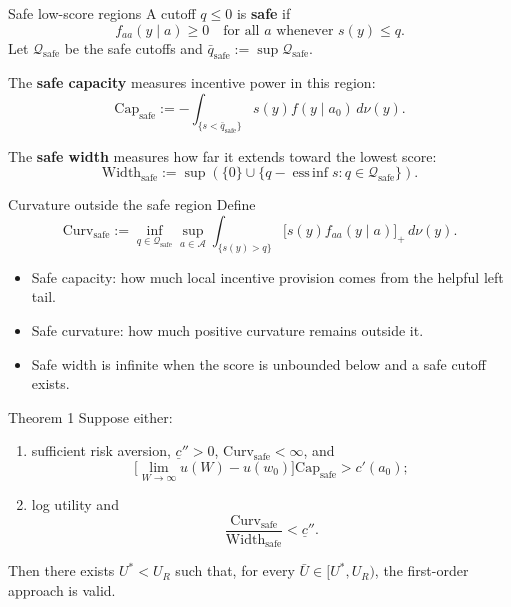 \documentclass[12pt,aspectratio=169,t]{beamer}
\begin{document}
\begin{frame}{Safe low-score regions}
  A cutoff $q\leq0$ is \textbf{safe} if
  \[
    f_{aa}(y\mid a)\geq0
    \quad\text{for all }a\text{ whenever }s(y)\leq q.
  \]
  Let $\mathcal Q_{\mathrm{safe}}$ be the safe cutoffs and
  $\bar q_{\mathrm{safe}}:=\sup\mathcal Q_{\mathrm{safe}}$.

  \medskip
  The \textbf{safe capacity} measures incentive power in this region:
  \[
    \mathrm{Cap}_{\mathrm{safe}}
    :=-\int_{\{s<\bar q_{\mathrm{safe}}\}}s(y)f(y\mid a_0)\,d\nu(y).
  \]

  The \textbf{safe width} measures how far it extends toward the lowest score:
  \[
    \mathrm{Width}_{\mathrm{safe}}
    :=\sup\!\left(\{0\}\cup
    \{q-\operatorname*{ess\,inf}s:q\in\mathcal Q_{\mathrm{safe}}\}\right).
  \]
\end{frame}

\begin{frame}{Curvature outside the safe region}
  Define
  \[
    \mathrm{Curv}_{\mathrm{safe}}
    :=\inf_{q\in\mathcal Q_{\mathrm{safe}}}
      \sup_{a\in\mathcal A}
      \int_{\{s(y)>q\}}
      \bigl[s(y)f_{aa}(y\mid a)\bigr]_+\,d\nu(y).
  \]
  \begin{itemize}
    \item Safe capacity: how much local incentive provision comes from the helpful left tail.
    \item Safe curvature: how much positive curvature remains outside it.
    \item Safe width is infinite when the score is unbounded below and a safe cutoff exists.
  \end{itemize}
\end{frame}

\begin{frame}{Theorem 1}
  Suppose either:
  \begin{enumerate}
    \item[(i)] sufficient risk aversion, $\underline c''>0$, $\mathrm{Curv}_{\mathrm{safe}}<\infty$, and
    \[
      \bigl[\lim_{W\to\infty}u(W)-u(w_0)\bigr]\mathrm{Cap}_{\mathrm{safe}}>c'(a_0);
    \]
    \item[(ii)] log utility and
    \[
      \frac{\mathrm{Curv}_{\mathrm{safe}}}{\mathrm{Width}_{\mathrm{safe}}}<\underline c''.
    \]
  \end{enumerate}
  Then there exists $U^*<U_R$ such that, for every $\bar U\in[U^*,U_R)$, the first-order approach is valid.
\end{frame}
\end{document}
